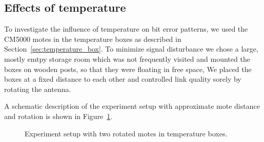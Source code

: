 
\subsection{Effects of temperature}
\label{subsec:effects_of_temperature}

To investigate the influence of temperature on bit error patterns, we used the CM5000 motes in the temperature boxes as described in Section~\ref{sec:temperature_box}.
To minimize signal disturbance we chose a large, mostly emtpy storage room which was not frequently visited and mounted the boxes on wooden posts, so that they were floating in free space, 
We placed the boxes at a fixed distance to each other and controlled link quality sorely by rotating the antenna.

A schematic description of the experiment setup with approximate mote distance and rotation is shown in Figure~\ref{fig:2mote_experiment_setup}.


\begin{figure}[H]
	\centering
	\caption{Experiment setup with two rotated motes in temperature boxes.}
	\label{fig:2mote_experiment_setup}
\end{figure}
